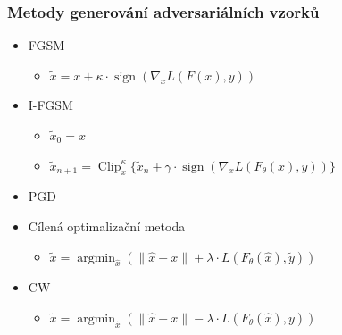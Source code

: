 \documentclass[czech]{beamer}
\begin{document}
\begin{frame}
    \frametitle{Metody generování adversariálních vzorků}
    \begin{itemize}
        \item FGSM
        \begin{itemize}
            \item $\tilde{x} = x + \kappa \cdot \operatorname{sign} \left( \nabla_x L(F(x), y) \right)$
        \end{itemize}
        \item I-FGSM
        \begin{itemize}
            \item $\tilde{x}_0 = x$
            \item $\tilde{x}_{n+1} = \operatorname{Clip}_x^\kappa \{\tilde{x}_n + \gamma \cdot \operatorname{sign}(\nabla_x L(F_{\theta}(x), y))\}$
        \end{itemize}
        \item PGD
        \item Cílená optimalizační metoda
        \begin{itemize}
            \item $\tilde{x} = \operatorname{argmin}_{\hat{x}} \left( \|\hat{x} - x\|
            + \lambda \cdot L(F_{\theta}(\hat{x}), \tilde{y}) \right)$
        \end{itemize}
        \item CW
        \begin{itemize}
            \item $\tilde{x} = \operatorname{argmin}_{\hat{x}} \left(\|\hat{x} - x\|
            - \lambda \cdot L(F_{\theta}(\hat{x}), y) \right)$
        \end{itemize}
    \end{itemize}
    

    
\end{frame}
\end{document}
